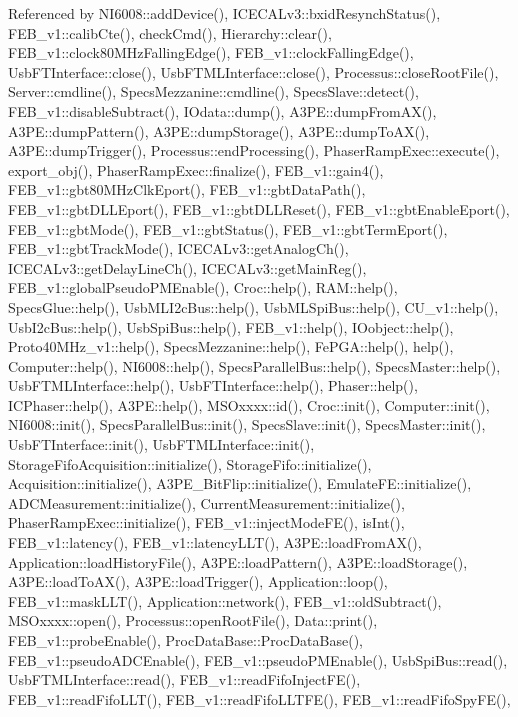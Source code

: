 Referenced by N\+I6008\+::add\+Device(), I\+C\+E\+C\+A\+Lv3\+::bxid\+Resynch\+Status(), F\+E\+B\+\_\+v1\+::calib\+Cte(), check\+Cmd(), Hierarchy\+::clear(), F\+E\+B\+\_\+v1\+::clock80\+M\+Hz\+Falling\+Edge(), F\+E\+B\+\_\+v1\+::clock\+Falling\+Edge(), Usb\+F\+T\+Interface\+::close(), Usb\+F\+T\+M\+L\+Interface\+::close(), Processus\+::close\+Root\+File(), Server\+::cmdline(), Specs\+Mezzanine\+::cmdline(), Specs\+Slave\+::detect(), F\+E\+B\+\_\+v1\+::disable\+Subtract(), I\+Odata\+::dump(), A3\+P\+E\+::dump\+From\+A\+X(), A3\+P\+E\+::dump\+Pattern(), A3\+P\+E\+::dump\+Storage(), A3\+P\+E\+::dump\+To\+A\+X(), A3\+P\+E\+::dump\+Trigger(), Processus\+::end\+Processing(), Phaser\+Ramp\+Exec\+::execute(), export\+\_\+obj(), Phaser\+Ramp\+Exec\+::finalize(), F\+E\+B\+\_\+v1\+::gain4(), F\+E\+B\+\_\+v1\+::gbt80\+M\+Hz\+Clk\+Eport(), F\+E\+B\+\_\+v1\+::gbt\+Data\+Path(), F\+E\+B\+\_\+v1\+::gbt\+D\+L\+L\+Eport(), F\+E\+B\+\_\+v1\+::gbt\+D\+L\+L\+Reset(), F\+E\+B\+\_\+v1\+::gbt\+Enable\+Eport(), F\+E\+B\+\_\+v1\+::gbt\+Mode(), F\+E\+B\+\_\+v1\+::gbt\+Status(), F\+E\+B\+\_\+v1\+::gbt\+Term\+Eport(), F\+E\+B\+\_\+v1\+::gbt\+Track\+Mode(), I\+C\+E\+C\+A\+Lv3\+::get\+Analog\+Ch(), I\+C\+E\+C\+A\+Lv3\+::get\+Delay\+Line\+Ch(), I\+C\+E\+C\+A\+Lv3\+::get\+Main\+Reg(), F\+E\+B\+\_\+v1\+::global\+Pseudo\+P\+M\+Enable(), Croc\+::help(), R\+A\+M\+::help(), Specs\+Glue\+::help(), Usb\+M\+L\+I2c\+Bus\+::help(), Usb\+M\+L\+Spi\+Bus\+::help(), C\+U\+\_\+v1\+::help(), Usb\+I2c\+Bus\+::help(), Usb\+Spi\+Bus\+::help(), F\+E\+B\+\_\+v1\+::help(), I\+Oobject\+::help(), Proto40\+M\+Hz\+\_\+v1\+::help(), Specs\+Mezzanine\+::help(), Fe\+P\+G\+A\+::help(), help(), Computer\+::help(), N\+I6008\+::help(), Specs\+Parallel\+Bus\+::help(), Specs\+Master\+::help(), Usb\+F\+T\+M\+L\+Interface\+::help(), Usb\+F\+T\+Interface\+::help(), Phaser\+::help(), I\+C\+Phaser\+::help(), A3\+P\+E\+::help(), M\+S\+Oxxxx\+::id(), Croc\+::init(), Computer\+::init(), N\+I6008\+::init(), Specs\+Parallel\+Bus\+::init(), Specs\+Slave\+::init(), Specs\+Master\+::init(), Usb\+F\+T\+Interface\+::init(), Usb\+F\+T\+M\+L\+Interface\+::init(), Storage\+Fifo\+Acquisition\+::initialize(), Storage\+Fifo\+::initialize(), Acquisition\+::initialize(), A3\+P\+E\+\_\+\+Bit\+Flip\+::initialize(), Emulate\+F\+E\+::initialize(), A\+D\+C\+Measurement\+::initialize(), Current\+Measurement\+::initialize(), Phaser\+Ramp\+Exec\+::initialize(), F\+E\+B\+\_\+v1\+::inject\+Mode\+F\+E(), is\+Int(), F\+E\+B\+\_\+v1\+::latency(), F\+E\+B\+\_\+v1\+::latency\+L\+L\+T(), A3\+P\+E\+::load\+From\+A\+X(), Application\+::load\+History\+File(), A3\+P\+E\+::load\+Pattern(), A3\+P\+E\+::load\+Storage(), A3\+P\+E\+::load\+To\+A\+X(), A3\+P\+E\+::load\+Trigger(), Application\+::loop(), F\+E\+B\+\_\+v1\+::mask\+L\+L\+T(), Application\+::network(), F\+E\+B\+\_\+v1\+::old\+Subtract(), M\+S\+Oxxxx\+::open(), Processus\+::open\+Root\+File(), Data\+::print(), F\+E\+B\+\_\+v1\+::probe\+Enable(), Proc\+Data\+Base\+::\+Proc\+Data\+Base(), F\+E\+B\+\_\+v1\+::pseudo\+A\+D\+C\+Enable(), F\+E\+B\+\_\+v1\+::pseudo\+P\+M\+Enable(), Usb\+Spi\+Bus\+::read(), Usb\+F\+T\+M\+L\+Interface\+::read(), F\+E\+B\+\_\+v1\+::read\+Fifo\+Inject\+F\+E(), F\+E\+B\+\_\+v1\+::read\+Fifo\+L\+L\+T(), F\+E\+B\+\_\+v1\+::read\+Fifo\+L\+L\+T\+F\+E(), F\+E\+B\+\_\+v1\+::read\+Fifo\+Spy\+F\+E(), 